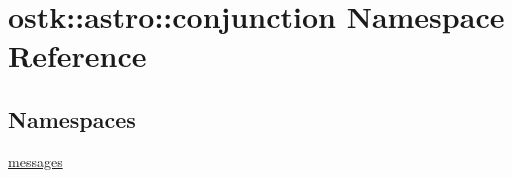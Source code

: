 \hypertarget{namespaceostk_1_1astro_1_1conjunction}{}\section{ostk\+:\+:astro\+:\+:conjunction Namespace Reference}
\label{namespaceostk_1_1astro_1_1conjunction}
\subsection*{Namespaces}
\begin{DoxyCompactItemize}
\item 
 \hyperlink{namespaceostk_1_1astro_1_1conjunction_1_1messages}{messages}
\end{DoxyCompactItemize}

